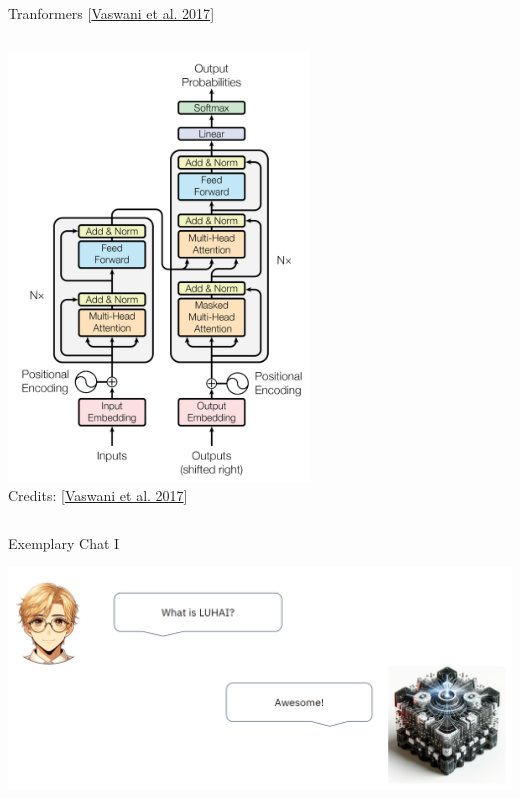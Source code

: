 \documentclass[aspectratio=169]{../latex_main/tntbeamer}  %
\begin{document}
\begin{frame}{Tranformers [\href{https://arxiv.org/pdf/1706.03762}{Vaswani et al. 2017}]}
\begin{columns}
\begin{column}{0.5\textwidth}
        \centering
        \vspace*{-2em}
        \includegraphics[width=0.6\textwidth]{figures/transformer.png}\\
        Credits: [\href{https://arxiv.org/pdf/1706.03762}{Vaswani et al. 2017}]

        \end{column}
            
        \end{columns}
        
        \end{frame}

        \begin{frame}{Exemplary Chat I}

            \centering
            \includegraphics[width=1\linewidth]{075_deep_learning/figures/transformer1.png}
        
        \end{frame}
\end{document}
